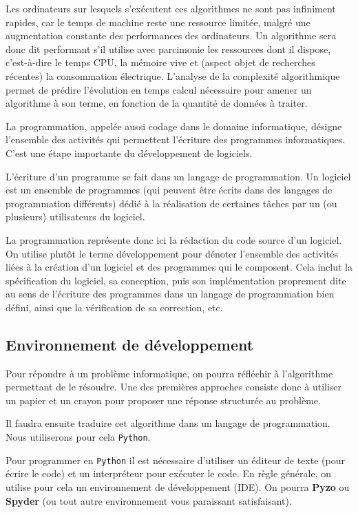 Les ordinateurs sur lesquels s'exécutent ces algorithmes ne sont pas infiniment rapides, car le temps de machine reste une ressource limitée, malgré une augmentation constante des performances des ordinateurs. Un algorithme sera donc dit performant s'il utilise avec parcimonie les ressources dont il dispose, c'est-à-dire le temps CPU, la mémoire vive et (aspect objet de recherches récentes) la consommation électrique. L’analyse de la complexité algorithmique permet de prédire l'évolution en temps calcul nécessaire pour amener un algorithme à son terme, en fonction de la quantité de données à traiter.

\begin{defi}
La programmation, appelée aussi codage dans le domaine informatique, désigne l'ensemble des activités qui permettent l'écriture des programmes informatiques. C'est une étape importante du développement de logiciels.

L'écriture d'un programme se fait dans un langage de programmation. Un logiciel est un ensemble de programmes (qui peuvent être écrits dans des langages de programmation différents) dédié à la réalisation de certaines tâches par un (ou plusieurs) utilisateurs du logiciel.

\end{defi}

La programmation représente donc ici la rédaction du code source d'un logiciel. On utilise plutôt le terme développement pour dénoter l'ensemble des activités liées à la création d'un logiciel et des programmes qui le composent. Cela inclut la spécification du logiciel, sa conception, puis son implémentation proprement dite au sens de l'écriture des programmes dans un langage de programmation bien défini, ainsi que la vérification de sa correction, etc.

\subsection{Environnement de développement}
Pour répondre à un problème informatique, on pourra réfléchir à l'algorithme permettant de le résoudre. Une des premières approches consiste donc à utiliser un papier et un crayon pour proposer une réponse structurée au problème.

Il faudra ensuite traduire cet algorithme dans un langage de programmation. Nous utiliserons pour cela \lstinline{Python}.

Pour programmer en \lstinline{Python} il est nécessaire d'utiliser un éditeur de texte (pour écrire le code) et un interpréteur pour exécuter le code. 
En règle générale, on utilise pour cela un environnement de développement (IDE). On pourra \textbf{Pyzo} ou \textbf{Spyder} (ou tout autre environnement vous paraissant satisfaisant). 

